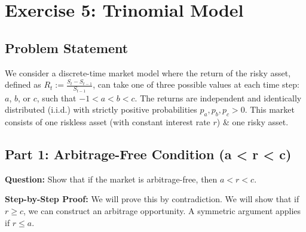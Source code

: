 \section{Exercise 5: Trinomial Model}

\subsection{Problem Statement}
We consider a discrete-time market model where the return of the risky asset, defined as $R_t := \frac{S_t - S_{t-1}}{S_{t-1}}$, can take one of three possible values at each time step: $a$, $b$, or $c$, such that $-1 < a < b < c$. 
The returns are independent and identically distributed (i.i.d.) with strictly positive probabilities $p_a, p_b, p_c > 0$.
This market consists of one riskless asset (with constant interest rate $r$) \& one risky asset.

\subsection{Part 1: Arbitrage-Free Condition (a < r < c)}

\textbf{Question:} Show that if the market is arbitrage-free, then $a < r < c$.

\textbf{Step-by-Step Proof:}
We will prove this by contradiction. We will show that if $r \ge c$, we can construct an arbitrage opportunity. A symmetric argument applies if $r \le a$.

